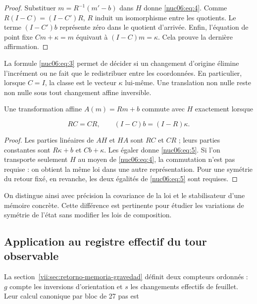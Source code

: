 \begin{proof}
Substituer \(m=R^{-1}(m'-b)\) dans \(H\) donne \eqref{nuc06:eq:4}. Comme \(R(I-C)=(I-C')R\), \(R\) induit un isomorphisme entre les quotients. Le terme \((I-C')b\) représente zéro dans le quotient d’arrivée. Enfin, l’équation de point fixe \(Cm+\kappa=m\) équivaut à \((I-C)m=\kappa\). Cela prouve la dernière affirmation.

\end{proof}

La formule \eqref{nuc06:eq:3} permet de décider si un changement d’origine élimine l’incrément ou ne fait que le redistribuer entre les coordonnées. En particulier, lorsque \(C=I\), la classe est le vecteur \(\kappa\) lui-même. Une translation non nulle reste non nulle sous tout changement affine inversible.

\begin{proposition}

Une transformation affine \(A(m)=Rm+b\) commute avec \(H\) exactement lorsque

\begin{equation}
RC=CR,\qquad (I-C)b=(I-R)\kappa.
\label{nuc06:eq:5}
\end{equation}
\end{proposition}

\begin{proof}
Les parties linéaires de \(AH\) et \(HA\) sont \(RC\) et \(CR\) ; leurs parties constantes sont \(R\kappa+b\) et \(Cb+\kappa\). Les égaler donne \eqref{nuc06:eq:5}. Si l’on transporte seulement \(H\) au moyen de \eqref{nuc06:eq:4}, la commutation n’est pas requise : on obtient la même loi dans une autre représentation. Pour une symétrie du retour fixé, en revanche, les deux égalités de \eqref{nuc06:eq:5} sont requises.
\end{proof}

On distingue ainsi avec précision la covariance de la loi et le stabilisateur d’une mémoire concrète. Cette différence est pertinente pour étudier les variations de symétrie de l’état sans modifier les lois de composition.


\subsection{Application au registre effectif du tour observable}

La section~\ref{vii:sec:retorno-memoria-gravedad} définit deux compteurs ordonnés : \(g\) compte les inversions d’orientation et \(s\) les changements effectifs de feuillet. Leur calcul canonique par bloc de 27 pas est

